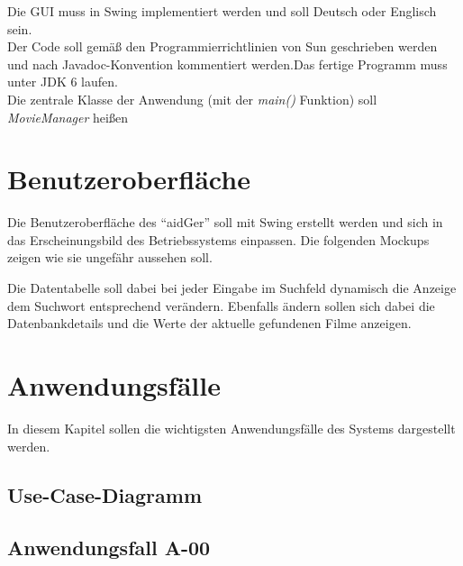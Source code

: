 \documentclass[oneside,german,oneside]{scrbook}
\begin{document}
        Die GUI muss in Swing implementiert werden und soll Deutsch oder
        Englisch sein.\\
        Der Code soll gem\"a{\ss} den Programmierrichtlinien von Sun geschrieben
        werden und nach Javadoc-Konvention kommentiert werden.Das fertige
        Programm muss unter JDK 6 laufen. \\
        Die zentrale Klasse der Anwendung (mit der \textit{main()} Funktion)
        soll \textit{MovieManager} heißen

\pagebreak

\section{Benutzeroberfl\"ache}\label{sec:Benutzeroberflaeche}

    Die Benutzeroberfl\"ache des ``aidGer'' soll mit Swing erstellt werden
    und sich in das Erscheinungsbild des Betriebssystems einpassen. Die
    folgenden Mockups zeigen wie sie ungef\"ahr aussehen soll.


  	\bigskip

  	Die Datentabelle soll dabei bei jeder Eingabe im Suchfeld dynamisch die
  	Anzeige dem Suchwort entsprechend ver\"andern. Ebenfalls \"andern sollen sich
  	dabei die Datenbankdetails und die Werte der aktuelle gefundenen Filme
  	anzeigen.

\pagebreak
\section{Anwendungsf\"alle}\label{sec:Anwendungsfaelle}

    In diesem Kapitel sollen die wichtigsten Anwendungsf\"alle des Systems
    dargestellt werden.
    
    \subsection{Use-Case-Diagramm}\label{sec:usecasediagramm}
    

    \subsection{Anwendungsfall A-00}\label{uc:00}
\end{document}
